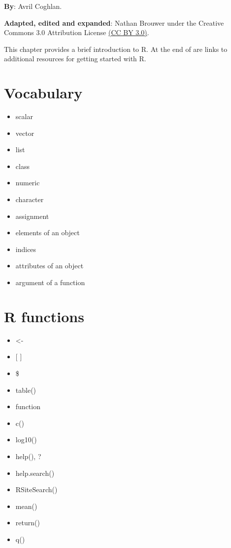 \documentclass[
]{book}
\providecommand{\tightlist}{%
  \setlength{\itemsep}{0pt}\setlength{\parskip}{0pt}}
\begin{document}
\textbf{By}: Avril Coghlan.

\textbf{Adapted, edited and expanded}: Nathan Brouwer under the Creative Commons 3.0 Attribution License \href{https://creativecommons.org/licenses/by/3.0/}{(CC BY 3.0)}.

This chapter provides a brief introduction to R. At the end of are links to additional resources for getting started with R.

\hypertarget{vocabulary}{%
\section{Vocabulary}\label{vocabulary}}

\begin{itemize}
\tightlist
\item
  scalar
\item
  vector
\item
  list
\item
  class
\item
  numeric
\item
  character
\item
  assignment
\item
  elements of an object
\item
  indices
\item
  attributes of an object
\item
  argument of a function
\end{itemize}

\hypertarget{r-functions}{%
\section{R functions}\label{r-functions}}

\begin{itemize}
\tightlist
\item
  \textless-
\item
  {[} {]}
\item
  \$
\item
  table()
\item
  function
\item
  c()
\item
  log10()
\item
  help(), ?
\item
  help.search()
\item
  RSiteSearch()
\item
  mean()
\item
  return()
\item
  q()
\end{itemize}
\end{document}
